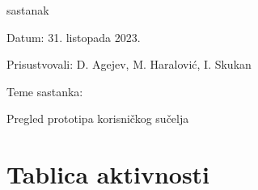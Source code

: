 \begin{packed_enum}
			\item  sastanak
			\item[] \begin{packed_item}
				\item Datum: 31. listopada 2023.
				\item Prisustvovali:  D. Agejev, M. Haralović, I. Skukan
				\item Teme sastanka:
				\begin{packed_item}
					\item  Pregled prototipa korisničkog sučelja
				\end{packed_item}
			\end{packed_item}
			
			
		\end{packed_enum}
		
		\eject
		\section*{Tablica aktivnosti}

